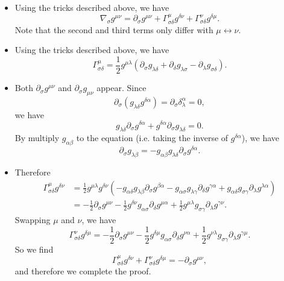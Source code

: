 \documentclass[hyperref, a4paper]{article}
\begin{document}
\begin{itemize}
    \item Using the tricks described above, we have 
    \[
        \nabla_\sigma g^{\mu \nu} = \partial_\sigma g^{\mu \nu} + \Gamma^\mu_{\sigma \delta} g^{\delta \nu} + \Gamma^\nu_{\sigma \delta} g^{\delta \mu}.
    \]
    Note that the second and third terms only differ with $\mu \leftrightarrow \nu$.
    \item Using the tricks described above, we have 
    \[
        \Gamma^\mu_{\sigma \delta} = \frac{1}{2} g^{\mu \lambda} (\partial_\sigma g_{\lambda \delta} + \partial_\delta g_{\lambda \sigma} - \partial_\lambda g_{\sigma \delta}).
    \]
    \item Both $\partial_\sigma g^{\mu \nu}$ and $\partial_\sigma g_{\mu \nu}$ appear. Since 
    \[
        \partial_\sigma (g_{\lambda \delta} g^{\delta \alpha}) = \partial_\sigma \delta^\alpha_\lambda = 0,
    \]
    we have 
    \[
        g_{\lambda \delta} \partial_\sigma g^{\delta \alpha} + g^{\delta \alpha} \partial_\sigma g_{\lambda \delta} = 0.
    \]
    By multiply $g_{\alpha \beta}$ to the equation (i.e. taking the inverse of $g^{\delta \alpha}$), we have 
    \[
        \partial_\sigma g_{\lambda \beta} = - g_{\alpha \beta} g_{\lambda \delta} \partial_\sigma g^{\delta \alpha}.
    \]
    \item Therefore \[
        \begin{aligned}
            \Gamma^\mu_{\sigma \delta} g^{\delta \nu} &= \frac{1}{2} g^{\mu \lambda} g^{\delta \nu} (- g_{\alpha \delta} g_{\lambda \beta} \partial_\sigma g^{\beta \alpha} - g_{\alpha \sigma} g_{\lambda \gamma} \partial_{\delta} g^{\gamma \alpha} + g_{\alpha \delta} g_{\sigma \gamma} \partial_\lambda g^{\lambda \alpha}) \\
            &= - \frac{1}{2} \partial_\sigma g^{\mu \nu} - \frac{1}{2} g^{\delta \nu} g_{\alpha \sigma} \partial_\delta g^{\mu \alpha} + \frac{1}{2} g^{\mu \lambda} g_{\sigma \gamma} \partial_\lambda g^{\gamma \nu} .
        \end{aligned}
    \] 
    Swapping $\mu$ and $\nu$, we have 
    \[
        \Gamma^\nu_{\sigma \delta} g^{\delta \mu} = - \frac{1}{2} \partial_\sigma g^{\mu \nu} - \frac{1}{2} g^{\delta \mu} g_{\alpha \sigma} \partial_\delta g^{\nu \alpha} + \frac{1}{2} g^{\nu \lambda} g_{\sigma \gamma} \partial_\lambda g^{\gamma \mu}.
    \]
    So we find 
    \[
        \Gamma^\mu_{\sigma \delta} g^{\delta \nu} + \Gamma^\nu_{\sigma \delta} g^{\delta \mu} = - \partial_\sigma g^{\mu \nu}, 
    \]
    and therefore we complete the proof.
\end{itemize}
\end{document}
